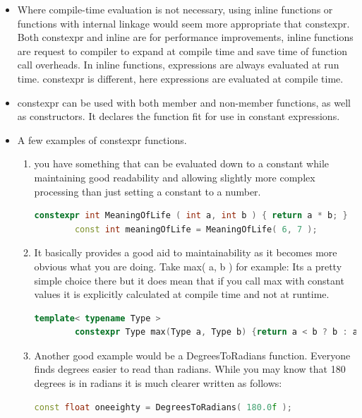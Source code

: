 \documentclass[a4paper,11pt,twoside]{book}
\begin{document}
\begin{itemize}
	\item Where compile-time evaluation is not necessary, using inline functions or functions with internal linkage would seem more appropriate that constexpr. Both constexpr and inline are for performance improvements, inline functions are request to compiler to expand at compile time and save time of function call overheads. In inline functions, expressions are always evaluated at run time. constexpr is different, here expressions are evaluated at compile time.
	
	\item constexpr can be used with both member and non-member functions, as well as constructors. It declares the function fit for use in constant expressions. 
	
	\item A few examples of constexpr functions. 
	\begin{enumerate}
		\item you have something that can be evaluated down to a constant while maintaining good readability and allowing slightly more complex processing than just setting a constant to a number.
		\begin{lstlisting}[frame=single, language=c++]
		constexpr int MeaningOfLife ( int a, int b ) { return a * b; }
		const int meaningOfLife = MeaningOfLife( 6, 7 );
		\end{lstlisting}
		
		\item It basically provides a good aid to maintainability as it becomes more obvious what you are doing. Take max( a, b ) for example: Its a pretty simple choice there but it does mean that if you call max with constant values it is explicitly calculated at compile time and not at runtime.
		\begin{lstlisting}[frame=single, language=c++]
		template< typename Type > 
		constexpr Type max(Type a, Type b) {return a < b ? b : a; }
		\end{lstlisting}
		
		\item Another good example would be a DegreesToRadians function. Everyone finds degrees easier to read than radians. While you may know that 180 degrees is in radians it is much clearer written as follows:
		\begin{lstlisting}[frame=single, language=c++]
		const float oneeighty = DegreesToRadians( 180.0f );
		\end{lstlisting}
		
	\end{enumerate}
	

\end{itemize}
\end{document}
